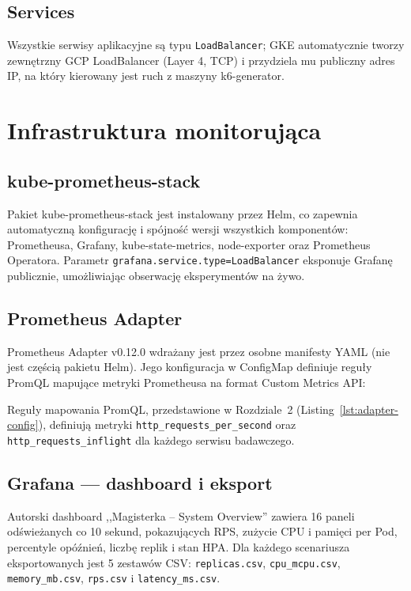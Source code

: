 \subsection{Services}

Wszystkie serwisy aplikacyjne są typu \texttt{LoadBalancer}; GKE automatycznie tworzy zewnętrzny GCP LoadBalancer (Layer 4, TCP) i przydziela mu publiczny adres IP, na który kierowany jest ruch z maszyny k6-generator.

\section{Infrastruktura monitorująca}

\subsection{kube-prometheus-stack}

Pakiet kube-prometheus-stack jest instalowany przez Helm, co zapewnia automatyczną konfigurację i spójność wersji wszystkich komponentów: Prometheusa, Grafany, kube-state-metrics, node-exporter oraz Prometheus Operatora. Parametr \texttt{grafana.service.type=LoadBalancer} eksponuje Grafanę publicznie, umożliwiając obserwację eksperymentów na żywo.

\subsection{Prometheus Adapter}

Prometheus Adapter v0.12.0 wdrażany jest przez osobne manifesty YAML (nie jest częścią pakietu Helm). Jego konfiguracja w ConfigMap definiuje reguły PromQL mapujące metryki Prometheusa na format Custom Metrics API:

Reguły mapowania PromQL, przedstawione w Rozdziale~2 (Listing~\ref{lst:adapter-config}), definiują metryki \texttt{http\_requests\_per\_second} oraz \texttt{http\_requests\_inflight} dla każdego serwisu badawczego.

\subsection{Grafana — dashboard i eksport}

Autorski dashboard ,,Magisterka -- System Overview'' zawiera 16 paneli odświeżanych co 10 sekund, pokazujących RPS, zużycie CPU i pamięci per Pod, percentyle opóźnień, liczbę replik i stan HPA. Dla każdego scenariusza eksportowanych jest 5 zestawów CSV: \texttt{replicas.csv}, \texttt{cpu\_mcpu.csv}, \texttt{memory\_mb.csv}, \texttt{rps.csv} i \texttt{latency\_ms.csv}.

